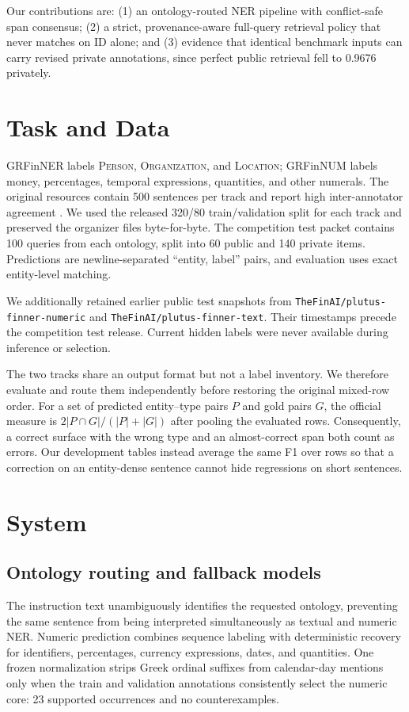 \documentclass[11pt]{article}
\begin{document}
Our contributions are: (1) an ontology-routed NER pipeline with conflict-safe span consensus; (2) a strict, provenance-aware full-query retrieval policy that never matches on ID alone; and (3) evidence that identical benchmark inputs can carry revised private annotations, since perfect public retrieval fell to 0.9676 privately.

\section{Task and Data}
GRFinNER labels \textsc{Person}, \textsc{Organization}, and \textsc{Location}; GRFinNUM labels money, percentages, temporal expressions, quantities, and other numerals. The original resources contain 500 sentences per track and report high inter-annotator agreement \citep{peng-etal-2025-plutus}. We used the released 320/80 train/validation split for each track and preserved the organizer files byte-for-byte. The competition test packet contains 100 queries from each ontology, split into 60 public and 140 private items. Predictions are newline-separated ``entity, label'' pairs, and evaluation uses exact entity-level matching.

We additionally retained earlier public test snapshots from \texttt{TheFinAI/plutus-finner-numeric} and \texttt{TheFinAI/plutus-finner-text}. Their timestamps precede the competition test release. Current hidden labels were never available during inference or selection.

The two tracks share an output format but not a label inventory.  We therefore
evaluate and route them independently before restoring the original mixed-row
order.  For a set of predicted entity--type pairs $P$ and gold pairs $G$, the
official measure is $2|P\cap G|/(|P|+|G|)$ after pooling the evaluated rows.
Consequently, a correct surface with the wrong type and an almost-correct span
both count as errors.  Our development tables instead average the same F1 over
rows so that a correction on an entity-dense sentence cannot hide regressions
on short sentences.

\section{System}
\subsection{Ontology routing and fallback models}
The instruction text unambiguously identifies the requested ontology, preventing the same sentence from being interpreted simultaneously as textual and numeric NER. Numeric prediction combines sequence labeling with deterministic recovery for identifiers, percentages, currency expressions, dates, and quantities. One frozen normalization strips Greek ordinal suffixes from calendar-day mentions only when the train and validation annotations consistently select the numeric core: 23 supported occurrences and no counterexamples.
\end{document}
